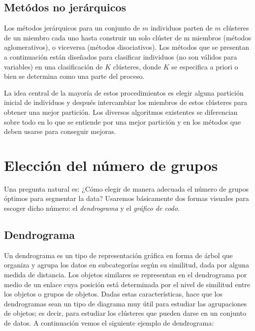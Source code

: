\documentclass[12pt,]{krantz}
\begin{document}
\hypertarget{metodos-no-jerarquicos}{%
\subsection{Metódos no jerárquicos}\label{metodos-no-jerarquicos}}

Los métodos jerárquicos para un conjunto de \(m\) individuos parten de \(m\) clústeres de un miembro cada uno hasta construir un solo clúster de m miembros (métodos aglomerativos), o viceversa (métodos disociativos). Los métodos que se presentan a continuación están diseñados para clasificar individuos (no son válidos para variables) en una clasificación de \(K\) clústeres, donde \(K\) se especifica a priori o bien se determina como una parte del proceso.

La idea central de la mayoría de estos procedimientos es elegir alguna partición inicial de individuos y después intercambiar los miembros de estos clústeres para obtener una mejor partición. Los diversos algoritmos existentes se diferencian sobre todo en lo que se entiende por una mejor partición y en los métodos que deben usarse para conseguir mejoras.

\hypertarget{eleccion-del-numero-de-grupos}{%
\section{Elección del número de grupos}\label{eleccion-del-numero-de-grupos}}

Una pregunta natural es: ¿Cómo elegir de manera adecuada el número de grupos óptimos para segmentar la data? Usaremos básicamente dos formas visuales para escoger dicho número: el \emph{dendrograma} y el \emph{gráfico de codo}.

\hypertarget{dendrograma}{%
\subsection{Dendrograma}\label{dendrograma}}

Un dendrograma es un tipo de representación gráfica en forma de árbol que organiza y agrupa los datos en subcategorías según su similitud, dada por alguna medida de distancia. Los objetos similares se representan en el dendrograma por medio de un enlace cuya posición está determinada por el nivel de similitud entre los objetos o grupos de objetos. Dadas estas características, hace que los dendrogramas sean un tipo de diagrama muy útil para estudiar las agrupaciones de objetos; es decir, para estudiar los clústeres que pueden darse en un conjunto de datos. A continuación vemos el siguiente ejemplo de dendrograma:
\end{document}

